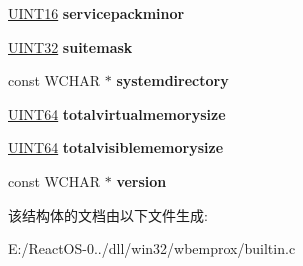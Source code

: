 \begin{DoxyCompactItemize}
\hyperlink{_processor_bind_8h_a09f1a1fb2293e33483cc8d44aefb1eb1}{U\+I\+N\+T16} {\bfseries servicepackminor}
\item 
\mbox{\label{structrecord__operatingsystem_a0518337a90fe44930177d043058f06d7}} 
\hyperlink{_processor_bind_8h_ae1e6edbbc26d6fbc71a90190d0266018}{U\+I\+N\+T32} {\bfseries suitemask}
\item 
\mbox{\label{structrecord__operatingsystem_a58ec6cfb0b98cbd77c503484650340a0}} 
const W\+C\+H\+AR $\ast$ {\bfseries systemdirectory}
\item 
\mbox{\label{structrecord__operatingsystem_a3ca676a1b7ea4d6c47faf3d251612442}} 
\hyperlink{_processor_bind_8h_a57be03562867144161c1bfee95ca8f7c}{U\+I\+N\+T64} {\bfseries totalvirtualmemorysize}
\item 
\mbox{\label{structrecord__operatingsystem_a18bc9fa6cb3658d79557df59d0f5d1fd}} 
\hyperlink{_processor_bind_8h_a57be03562867144161c1bfee95ca8f7c}{U\+I\+N\+T64} {\bfseries totalvisiblememorysize}
\item 
\mbox{\label{structrecord__operatingsystem_af7790ccfc9ecb0f94791089c4bf92d5d}} 
const W\+C\+H\+AR $\ast$ {\bfseries version}
\end{DoxyCompactItemize}


该结构体的文档由以下文件生成\+:\begin{DoxyCompactItemize}
\item 
E\+:/\+React\+O\+S-\/0../dll/win32/wbemprox/builtin.\+c\end{DoxyCompactItemize}
